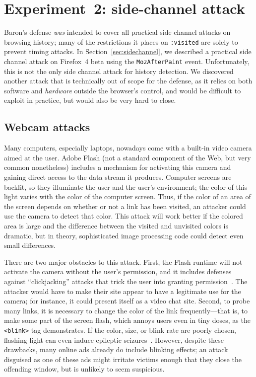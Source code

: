 \documentclass[conference]{IEEEtran}
\begin{document}
\section{Experiment~2: side-channel attack}\label{sec:sideexpt}

Baron's defense \emph{was} intended to cover all practical side
channel attacks on browsing history; many of the restrictions it
places on \texttt{:visited} are solely to prevent timing attacks.
In Section~\ref{sec:sidechannel}, we described a practical side
channel attack on Firefox~4 beta using the \texttt{MozAfterPaint}
event. Unfortunately, this is not the only side channel attack for
history detection.  We discovered another attack that is technically
out of scope for the defense, as it relies on both software and
\emph{hardware} outside the browser's control, and would be difficult
to exploit in practice, but would also be very hard to close.

\subsection{Webcam attacks}

Many computers, especially laptops, nowadays come with a built-in
video camera aimed at the user.  Adobe Flash (not a standard component
of the Web, but very common nonetheless) includes a mechanism for
activating this camera and gaining direct access to the data stream it
produces.  Computer screens are backlit, so they illuminate the user
and the user's environment; the color of this light varies with the
color of the computer screen.  Thus, if the color of an area of the
screen depends on whether or not a link has been visited, an attacker
could use the camera to detect that color.  This attack will work
better if the colored area is large and the difference between the
visited and unvisited colors is dramatic, but in theory, sophisticated
image processing code could detect even small differences.

There are two major obstacles to this attack. First, the Flash runtime
will not activate the camera without the user's permission, and it
includes defenses against “clickjacking” attacks that trick the user
into granting permission~\cite{clickjacking,flash-clickjacking}.  The
attacker would have to make their site appear to have a legitimate use
for the camera; for instance, it could present itself as a video chat
site.  Second, to probe many links, it is necessary to change the
color of the link frequently---that is, to make some part of the
screen flash, which annoys users even in tiny doses, as the
\verb|<blink>| tag demonstrates.  If the color, size, or blink rate
are poorly chosen, flashing light can even induce epileptic
seizures~\cite{wcag}.  However, despite these drawbacks, many online
ads already do include blinking effects; an attack disguised as one of
these ads might irritate victims enough that they close the offending
window, but is unlikely to seem suspicious.
\end{document}
